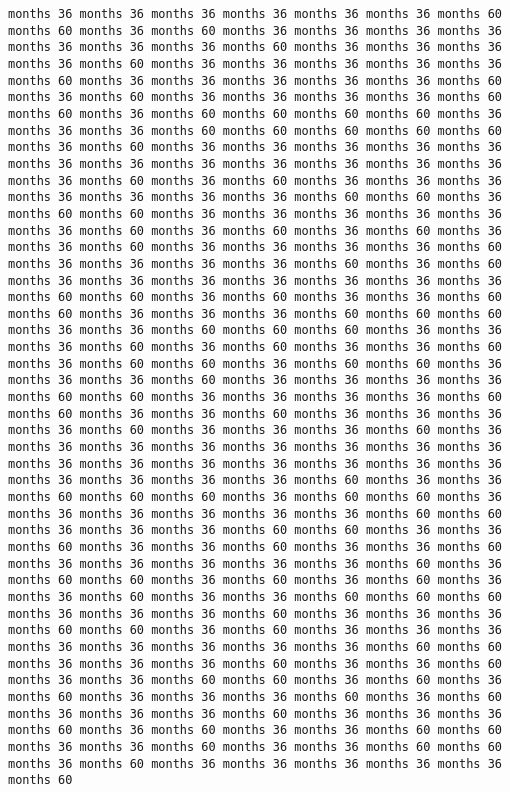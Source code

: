 \documentclass[11pt]{article}
\begin{document}
\begin{Verbatim}[commandchars=\\\{\}, frame=single, framerule=2mm, rulecolor=\color{outerrorbackground}]
months 36 months 36 months 36 months 36 months 36 months 36 months 60 months 60 months 36 months 60 months 36 months 36 months 36 months 36 months 36 months 36 months 36 months 60 months 36 months 36 months 36 months 36 months 60 months 36 months 36 months 36 months 36 months 36 months 60 months 36 months 36 months 36 months 36 months 36 months 60 months 36 months 60 months 36 months 36 months 36 months 36 months 60 months 60 months 36 months 60 months 60 months 60 months 60 months 36 months 36 months 36 months 60 months 60 months 60 months 60 months 60 months 36 months 60 months 36 months 36 months 36 months 36 months 36 months 36 months 36 months 36 months 36 months 36 months 36 months 36 months 36 months 60 months 36 months 60 months 36 months 36 months 36 months 36 months 36 months 36 months 36 months 60 months 60 months 36 months 60 months 60 months 36 months 36 months 36 months 36 months 36 months 36 months 60 months 36 months 60 months 36 months 60 months 36 months 36 months 60 months 36 months 36 months 36 months 36 months 60 months 36 months 36 months 36 months 36 months 60 months 36 months 60 months 36 months 36 months 36 months 36 months 36 months 36 months 36 months 60 months 60 months 36 months 60 months 36 months 36 months 60 months 60 months 36 months 36 months 36 months 60 months 60 months 60 months 36 months 36 months 60 months 60 months 60 months 36 months 36 months 36 months 60 months 36 months 60 months 36 months 36 months 60 months 36 months 60 months 60 months 36 months 60 months 60 months 36 months 36 months 36 months 60 months 36 months 36 months 36 months 36 months 60 months 60 months 36 months 36 months 36 months 36 months 60 months 60 months 36 months 36 months 60 months 36 months 36 months 36 months 36 months 60 months 36 months 36 months 36 months 60 months 36 months 36 months 36 months 36 months 36 months 36 months 36 months 36 months 36 months 36 months 36 months 36 months 36 months 36 months 36 months 36 months 36 months 36 months 36 months 60 months 36 months 36 months 60 months 60 months 60 months 36 months 60 months 60 months 36 months 36 months 36 months 36 months 36 months 36 months 60 months 60 months 36 months 36 months 36 months 60 months 60 months 36 months 36 months 60 months 36 months 36 months 60 months 36 months 36 months 60 months 36 months 36 months 36 months 36 months 36 months 60 months 36 months 60 months 60 months 36 months 60 months 36 months 60 months 36 months 36 months 60 months 36 months 36 months 60 months 60 months 60 months 36 months 36 months 36 months 60 months 36 months 36 months 36 months 60 months 60 months 36 months 60 months 36 months 36 months 36 months 36 months 36 months 36 months 36 months 36 months 60 months 60 months 36 months 36 months 36 months 60 months 36 months 36 months 60 months 36 months 36 months 60 months 60 months 36 months 60 months 36 months 60 months 36 months 36 months 36 months 60 months 36 months 60 months 36 months 36 months 36 months 60 months 36 months 36 months 36 months 60 months 36 months 60 months 36 months 36 months 60 months 60 months 36 months 36 months 60 months 36 months 36 months 60 months 60 months 36 months 60 months 36 months 36 months 36 months 36 months 36 months 60 
\end{Verbatim}
\end{document}
